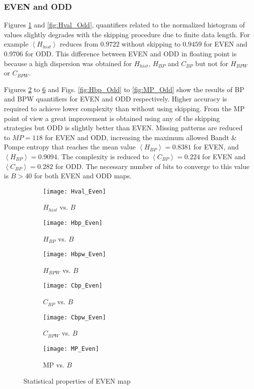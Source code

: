 \subsubsection{EVEN and ODD} \label{sssec:skipp}

Figures \ref{fig:Hval_Even} and \ref{fig:Hval_Odd}, quantifiers related to the normalized histogram of values slightly degrades with the skipping procedure due to finite data length.
For example $\left\langle H_{hist}\right\rangle $ reduces from $0.9722$ without skipping to $0.9459$ for EVEN and $0.9706$ for ODD. 
This difference between EVEN and ODD in floating point is because a high dispersion was obtained for $H_{hist}$, $H_{BP}$ and $C_{BP}$ but not for $H_{BPW}$ or $C_{BPW}$.

Figures \ref{fig:Hbp_Even} to \ref{fig:MP_Even} and Figs. \ref{fig:Hbp_Odd} to \ref{fig:MP_Odd} show the results of BP and BPW quantifiers for EVEN and ODD respectively.
Higher accuracy is required to achieve lower complexity than without using skipping.
From the MP point of view a great improvement is obtained using any of the skipping strategies but ODD is slightly better than EVEN.
Missing patterns are reduced to $MP = 118$ for EVEN and ODD, increasing the maximum allowed Bandt \& Pompe entropy that reaches the mean value $\left\langle H_{BP}\right\rangle  = 0.8381$ for EVEN, and $\left\langle H_{BP}\right\rangle  = 0.9094$.
The complexity is reduced to $\left\langle C_{BP}\right\rangle = 0.224$ for EVEN and $\left\langle C_{BP}\right\rangle = 0.282$ for ODD.
The necessary number of bits to converge to this value is $B>40$ for both EVEN and ODD maps.

\begin{figure}[htpb]
	\centering
	\begin{subfigure}[b]{0.49\textwidth}
		\texttt{[image: Hval\_Even]}
		\caption{$H_{hist}$ vs. $B$}
		\label{fig:Hval_Even}
	\end{subfigure}
	\begin{subfigure}[b]{0.49\textwidth}
		\texttt{[image: Hbp\_Even]}
		\caption{$H_{BP}$ vs. $B$}
		\label{fig:Hbp_Even}
	\end{subfigure}
	\begin{subfigure}[b]{0.49\textwidth}
		\texttt{[image: Hbpw\_Even]}
		\caption{$H_{BPW}$ vs. $B$}
		\label{fig:Hbpw_Even}
	\end{subfigure}
	\begin{subfigure}[b]{0.49\textwidth}
		\texttt{[image: Cbp\_Even]}
		\caption{$C_{BP}$ vs. $B$}
		\label{fig:Cbp_Even}
	\end{subfigure}
	\begin{subfigure}[b]{0.49\textwidth}
		\texttt{[image: Cbpw\_Even]}
		\caption{$C_{BPW}$ vs. $B$}
		\label{fig:Cbpw_Even}
	\end{subfigure}
	\begin{subfigure}[b]{0.49\textwidth}
		\texttt{[image: MP\_Even]}
		\caption{MP vs. $B$}
		\label{fig:MP_Even}
	\end{subfigure}
	\caption{Statistical properties of EVEN map}
	\label{fig:EVEN_QuantiB}
\end{figure}

